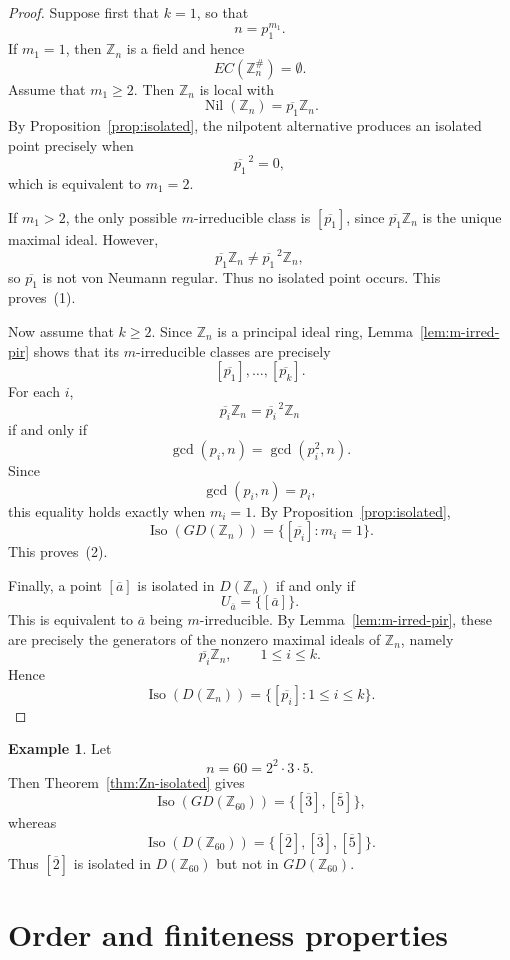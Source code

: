 \documentclass[11pt]{amsart}
\theoremstyle{plain}
\theoremstyle{definition}
\newtheorem{example}[theorem]{Example}
\theoremstyle{remark}
\numberwithin{equation}{section}
\begin{document}
\begin{proof}
	Suppose first that $k=1$, so that
	\[
	n=p_1^{m_1}.
	\]
	If $m_1=1$, then $\mathbb Z_n$ is a field and hence
	\[
	EC(\mathbb Z_n^\#)=\emptyset.
	\]
	Assume that $m_1\geq2$. Then $\mathbb Z_n$ is local with
	\[
	\operatorname{Nil}(\mathbb Z_n)
	=
	\overline{p_1}\mathbb Z_n.
	\]
	By Proposition~\ref{prop:isolated}, the nilpotent alternative produces
	an isolated point precisely when
	\[
	\overline{p_1}^{\,2}=0,
	\]
	which is equivalent to $m_1=2$.
	
	If $m_1>2$, the only possible $m$-irreducible class is
	$[\overline{p_1}]$, since
	$\overline{p_1}\mathbb Z_n$ is the unique maximal ideal. However,
	\[
	\overline{p_1}\mathbb Z_n
	\neq
	\overline{p_1}^{\,2}\mathbb Z_n,
	\]
	so $\overline{p_1}$ is not von Neumann regular. Thus no isolated point
	occurs. This proves~(1).
	
	Now assume that $k\geq2$. Since $\mathbb Z_n$ is a principal ideal
	ring, Lemma~\ref{lem:m-irred-pir} shows that its $m$-irreducible
	classes are precisely
	\[
	[\overline{p_1}],\ldots,[\overline{p_k}].
	\]
	For each $i$,
	\[
	\overline{p_i}\mathbb Z_n
	=
	\overline{p_i}^{\,2}\mathbb Z_n
	\]
	if and only if
	\[
	\gcd(p_i,n)=\gcd(p_i^2,n).
	\]
	Since
	\[
	\gcd(p_i,n)=p_i,
	\]
	this equality holds exactly when $m_i=1$. By
	Proposition~\ref{prop:isolated},
	\[
	\operatorname{Iso}(GD(\mathbb Z_n))
	=
	\{[\overline{p_i}]:m_i=1\}.
	\]
	This proves~(2).
	
	Finally, a point $[\overline a]$ is isolated in $D(\mathbb Z_n)$ if
	and only if
	\[
	U_{\overline a}=\{[\overline a]\}.
	\]
	This is equivalent to $\overline a$ being $m$-irreducible. By
	Lemma~\ref{lem:m-irred-pir}, these are precisely the generators of the
	nonzero maximal ideals of $\mathbb Z_n$, namely
	\[
	\overline{p_i}\mathbb Z_n,
	\qquad
	1\leq i\leq k.
	\]
	Hence
	\[
	\operatorname{Iso}(D(\mathbb Z_n))
	=
	\{[\overline{p_i}]:1\leq i\leq k\}.
	\]
\end{proof}


\begin{example}\label{ex:Z60}
	Let
	\[
	n=60=2^2\cdot3\cdot5.
	\]
	Then Theorem~\ref{thm:Zn-isolated} gives
	\[
	\operatorname{Iso}(GD(\mathbb Z_{60}))
	=
	\{[\overline3],[\overline5]\},
	\]
	whereas
	\[
	\operatorname{Iso}(D(\mathbb Z_{60}))
	=
	\{[\overline2],[\overline3],[\overline5]\}.
	\]
	Thus $[\overline2]$ is isolated in $D(\mathbb Z_{60})$ but not in
	$GD(\mathbb Z_{60})$.
\end{example}

\section{Order and finiteness properties}
\end{document}
